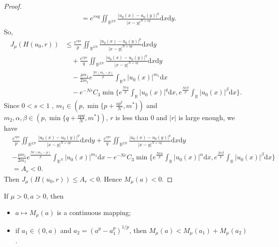 \documentclass[reqno]{amsart}
\begin{document}
\begin{proof}
\begin{align*}
&=e^{rsq}\iint_{\mathbb{R}^{2N}}\frac{|u_0(x)-u_0(y)|^{q}}{|x-y|^{N+sq}}
 \mathrm{d}x\mathrm{d}y.
\end{align*}
So,
\begin{align*}
J_\mu(H(u_0,r))
&\le\frac{e^{rps}}{p}\iint_{\mathbb{R}^{2N}}\frac{|u_0(x)-u_0(y)|^{p}}{|x-y|^{N+sp}}
 \mathrm{d}x\mathrm{d}y\\
&\quad +\frac{e^{rps}}{q}\iint_{\mathbb{R}^{2N}}\frac{|u_0(x)-u_0(y)|^{q}}{|x-y|^{N+sq}}
 \mathrm{d}x\mathrm{d}y\\
&\quad -\frac{\mu\alpha_1}{2m_1}e^{\frac{Nr(m_1-p)}{p}}\int_{\mathbb{R}^N}|u_0(x)|^{m_1}
 \mathrm{d}x\\
&\quad -e^{-Nr}C_{3}\min\{e^{\frac{Nrq}{p}}\int_{\mathbb{R}}|u_0(x)|^{q}
 \mathrm{d}x,e^{\frac{Nr\beta}{p}}\int_{\mathbb{R}}|u_0(x)|^{\beta}\mathrm{d}x\}.
\end{align*}
Since $0<s< 1$ , $m_1\in(p,\min\{p+\frac{sp^2}{N},m^{*}\})$ and 
$m_2,\alpha,\beta\in(p,\min\{q+\frac{spq}{N},m^{*}\})$, $r $ is less than 
$0$ and $|r|$ is large enough, we have
\begin{align*}
&\frac{e^{rps}}{p}\iint_{\mathbb{R}^{2N}}\frac{|u_0(x)-u_0(y)|^{p}}{|x-y|^{N+sp}}
 \mathrm{d}x\mathrm{d}y+\frac{e^{rps}}{q}\iint_{\mathbb{R}^{2N}}
 \frac{|u_0(x)-u_0(y)|^{q}}{|x-y|^{N+sq}}\mathrm{d}x\mathrm{d}y\\
&-\frac{\mu\alpha_1}{2m_1}e^{\frac{Nr(m_1-p)}{p}}\int_{\mathbb{R}^N}|u_0(x)|^{m_1}
 \mathrm{d}x-e^{-Nr}C_{3}\min\{e^{\frac{Nr\alpha}{p}}\int_{\mathbb{R}}|u_0(x)|^{\alpha}
 \mathrm{d}x,e^{\frac{Nr\beta}{p}}\int_{\mathbb{R}}|u_0(x)|^{\beta}\mathrm{d}x\}\\
&= A_r<0.
\end{align*}
Then
$J_\mu(H(u_0,r))\le A_r<0$.
Hence $M_\mu (a)<0$.
\end{proof}

\begin{lemma}\label{lem:2.3} 
If $\mu>0,a>0$, then
\begin{itemize}
\item[(i)] $a\mapsto M_\mu (a)$ is a continuous mapping;
\item[(ii)] if $a_1\in(0,a)$ and $a_2=(a^{p}-a_1^{p})^{1/p}$,
then $M_\mu(a)<M_\mu(a_1)+M_\mu(a_2)$.
\end{itemize}
\end{lemma}
\end{document}
